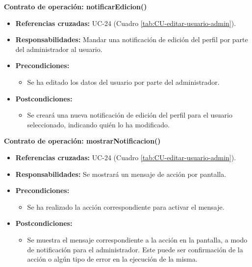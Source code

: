 \textbf{Contrato de operación: notificarEdicion()}
\begin{itemize}
\item \textbf{Referencias cruzadas:} UC-24 (Cuadro \ref{tab:CU-editar-usuario-admin}).
\item \textbf{Responsabilidades:} Mandar una notificación de edición del perfil por parte del administrador al usuario.
\item \textbf{Precondiciones:} 
 \begin{itemize}
\item Se ha editado los datos del usuario por parte del administrador.
\end {itemize}
\item \textbf{Postcondiciones:} 
 \begin{itemize}
\item Se creará una nueva notificación de edición del perfil para el usuario seleccionado, indicando quién lo ha modificado.
\end {itemize}
\end {itemize}

\textbf{Contrato de operación: mostrarNotificacion()}
\begin{itemize}
\item \textbf{Referencias cruzadas:} UC-24 (Cuadro \ref{tab:CU-editar-usuario-admin}).
\item \textbf{Responsabilidades:} Se mostrará un mensaje de acción por pantalla.
\item \textbf{Precondiciones:} 
 \begin{itemize}
\item Se ha realizado la acción correspondiente para activar el mensaje.
\end {itemize}
\item \textbf{Postcondiciones:} 
 \begin{itemize}
\item Se muestra el mensaje correspondiente a la acción en la pantalla, a modo de notificación para el administrador. Este puede ser confirmación de la acción o algún tipo de error en la ejecución de la misma.
\end {itemize}
\end {itemize}


\vspace{10mm}

